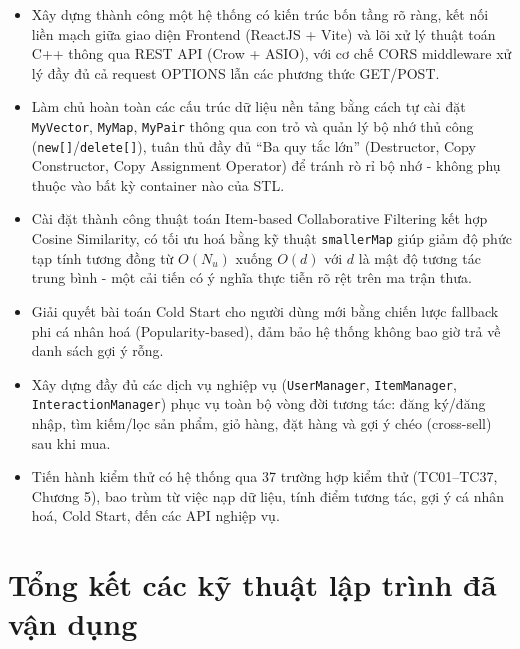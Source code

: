 \documentclass{report}
\begin{document}
\begin{itemize}
    \item Xây dựng thành công một hệ thống có kiến trúc bốn tầng rõ ràng, kết nối liền mạch giữa giao diện Frontend (ReactJS + Vite) và lõi xử lý thuật toán C++ thông qua REST API (Crow + ASIO), với cơ chế CORS middleware xử lý đầy đủ cả request OPTIONS lẫn các phương thức GET/POST.
    \item Làm chủ hoàn toàn các cấu trúc dữ liệu nền tảng bằng cách tự cài đặt \texttt{MyVector}, \texttt{MyMap}, \texttt{MyPair} thông qua con trỏ và quản lý bộ nhớ thủ công (\texttt{new[]}/\texttt{delete[]}), tuân thủ đầy đủ ``Ba quy tắc lớn'' (Destructor, Copy Constructor, Copy Assignment Operator) để tránh rò rỉ bộ nhớ - không phụ thuộc vào bất kỳ container nào của STL.
    \item Cài đặt thành công thuật toán Item-based Collaborative Filtering kết hợp Cosine Similarity, có tối ưu hoá bằng kỹ thuật \texttt{smallerMap} giúp giảm độ phức tạp tính tương đồng từ $O(N_u)$ xuống $O(d)$ với $d$ là mật độ tương tác trung bình - một cải tiến có ý nghĩa thực tiễn rõ rệt trên ma trận thưa.
    \item Giải quyết bài toán Cold Start cho người dùng mới bằng chiến lược fallback phi cá nhân hoá (Popularity-based), đảm bảo hệ thống không bao giờ trả về danh sách gợi ý rỗng.
    \item Xây dựng đầy đủ các dịch vụ nghiệp vụ (\texttt{UserManager}, \texttt{ItemManager}, \texttt{InteractionManager}) phục vụ toàn bộ vòng đời tương tác: đăng ký/đăng nhập, tìm kiếm/lọc sản phẩm, giỏ hàng, đặt hàng và gợi ý chéo (cross-sell) sau khi mua.
    \item Tiến hành kiểm thử có hệ thống qua 37 trường hợp kiểm thử (TC01--TC37, Chương 5), bao trùm từ việc nạp dữ liệu, tính điểm tương tác, gợi ý cá nhân hoá, Cold Start, đến các API nghiệp vụ.
\end{itemize}

\section{Tổng kết các kỹ thuật lập trình đã vận dụng}
\end{document}
